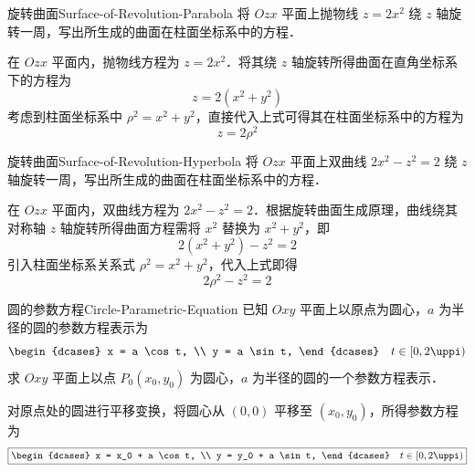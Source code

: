 \begin{problem}{旋转曲面}{Surface-of-Revolution-Parabola}
    将 $Ozx$ 平面上抛物线 $z = 2x^2$ 绕 $z$ 轴旋转一周，写出所生成的曲面在柱面坐标系中的方程．
\end{problem}

\begin{solution}
    在 $Ozx$ 平面内，抛物线方程为 $z = 2x^2$．将其绕 $z$ 轴旋转所得曲面在直角坐标系下的方程为
    \begin{equation}
        z = 2(x^2 + y^2)
    \end{equation}
    考虑到柱面坐标系中 $\rho^2 = x^2 + y^2$，直接代入上式可得其在柱面坐标系中的方程为
    \begin{equation}
        \boxed{z = 2\rho^2}
    \end{equation}
\end{solution}

\begin{problem}{旋转曲面}{Surface-of-Revolution-Hyperbola}
    将 $Ozx$ 平面上双曲线 $2x^2 - z^2 = 2$ 绕 $z$ 轴旋转一周，写出所生成的曲面在柱面坐标系中的方程．
\end{problem}

\begin{solution}
    在 $Ozx$ 平面内，双曲线方程为 $2x^2 - z^2 = 2$．根据旋转曲面生成原理，曲线绕其对称轴 $z$ 轴旋转所得曲面方程需将 $x^2$ 替换为 $x^2 + y^2$，即
    \begin{equation}
        2(x^2 + y^2) - z^2 = 2
    \end{equation}
    引入柱面坐标系关系式 $\rho^2 = x^2 + y^2$，代入上式即得
    \begin{equation}
        \boxed{2\rho^2 - z^2 = 2}
    \end{equation}
\end{solution}


\begin{problem}{圆的参数方程}{Circle-Parametric-Equation}
    已知 $Oxy$ 平面上以原点为圆心，$a$ 为半径的圆的参数方程表示为
    \begin{equation}
        \begin{dcases}
            x = a \cos t, \\
            y = a \sin t,
        \end{dcases} \quad t \in [0, 2\uppi)
    \end{equation}
    求 $Oxy$ 平面上以点 $P_0(x_0, y_0)$ 为圆心，$a$ 为半径的圆的一个参数方程表示．
\end{problem}

\begin{solution}
    对原点处的圆进行平移变换，将圆心从 $(0, 0)$ 平移至 $(x_0, y_0)$，所得参数方程为
    \begin{equation}
        \boxed{
        \begin{dcases}
            x = x_0 + a \cos t, \\
            y = y_0 + a \sin t,
        \end{dcases} \quad t \in [0, 2\uppi)
        }
    \end{equation}
\end{solution}


